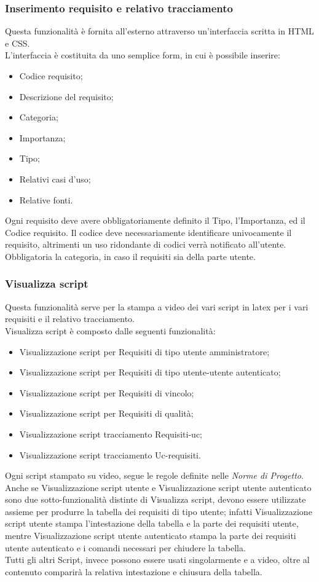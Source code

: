 \subsubsection{Inserimento requisito e relativo tracciamento}
Questa funzionalità è fornita all'esterno attraverso un'interfaccia scritta in HTML e CSS.\\
L'interfaccia è costituita da uno semplice form, in cui è possibile inserire:
\begin{itemize}
\item Codice requisito;
\item Descrizione del requisito;
\item Categoria;
\item Importanza;
\item Tipo;
\item Relativi casi d'uso;
\item Relative fonti.
\end{itemize}
Ogni requisito deve avere obbligatoriamente definito il Tipo, l'Importanza, ed il Codice requisito. Il codice deve necessariamente identificare univocamente il requisito, altrimenti un uso ridondante di codici verrà notificato all'utente. Obbligatoria la categoria, in caso il requisiti sia della parte utente.
\subsubsection{Visualizza script}
Questa funzionalità serve per la stampa a video dei vari script in latex per i vari requisiti e il relativo tracciamento.\\ Visualizza script è composto dalle seguenti funzionalità:
	\begin{itemize}
		\item Visualizzazione script per Requisiti di tipo utente amministratore;
		\item Visualizzazione script per Requisiti di tipo utente-utente autenticato;
		\item Visualizzazione script per Requisiti di vincolo;
		\item Visualizzazione script per Requisiti di qualità;
		\item Visualizzazione script tracciamento Requisiti-uc;
		\item Visualizzazione script tracciamento Uc-requisiti.
	\end{itemize}
Ogni script stampato su video, segue le regole definite nelle \textit{Norme di Progetto}.\\
Anche se Visualizzazione script utente e Visualizzazione script utente autenticato sono due sotto-funzionalità distinte di Visualizza script, devono essere utilizzate assieme per produrre la tabella dei requisiti di tipo utente; infatti Visualizzazione script utente stampa l'intestazione della tabella e la parte dei requisiti utente, mentre Visualizzazione script utente autenticato stampa la parte dei requisiti utente autenticato e i comandi necessari per chiudere la tabella.\\
Tutti gli altri Script, invece possono essere usati singolarmente e a video, oltre al contenuto comparirà la relativa intestazione e chiusura della tabella.